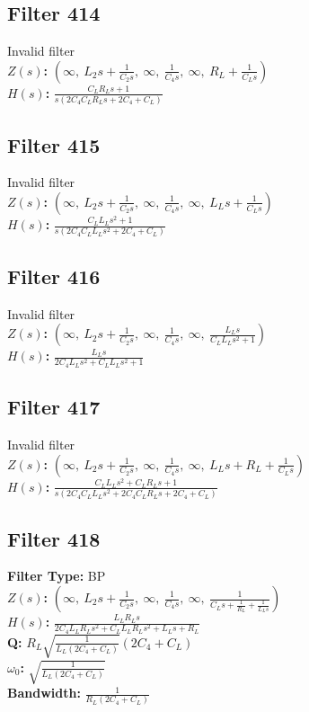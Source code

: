 \documentclass{article}
\begin{document}
\subsection*{Filter 414}
Invalid filter \\ 
\textbf{$Z(s)$:} $\left( \infty, \  L_{2} s + \frac{1}{C_{2} s}, \  \infty, \  \frac{1}{C_{4} s}, \  \infty, \  R_{L} + \frac{1}{C_{L} s}\right)$ \\ 
\textbf{$H(s)$:} $\frac{C_{L} R_{L} s + 1}{s \left(2 C_{4} C_{L} R_{L} s + 2 C_{4} + C_{L}\right)}$ \\ 
\subsection*{Filter 415}
Invalid filter \\ 
\textbf{$Z(s)$:} $\left( \infty, \  L_{2} s + \frac{1}{C_{2} s}, \  \infty, \  \frac{1}{C_{4} s}, \  \infty, \  L_{L} s + \frac{1}{C_{L} s}\right)$ \\ 
\textbf{$H(s)$:} $\frac{C_{L} L_{L} s^{2} + 1}{s \left(2 C_{4} C_{L} L_{L} s^{2} + 2 C_{4} + C_{L}\right)}$ \\ 
\subsection*{Filter 416}
Invalid filter \\ 
\textbf{$Z(s)$:} $\left( \infty, \  L_{2} s + \frac{1}{C_{2} s}, \  \infty, \  \frac{1}{C_{4} s}, \  \infty, \  \frac{L_{L} s}{C_{L} L_{L} s^{2} + 1}\right)$ \\ 
\textbf{$H(s)$:} $\frac{L_{L} s}{2 C_{4} L_{L} s^{2} + C_{L} L_{L} s^{2} + 1}$ \\ 
\subsection*{Filter 417}
Invalid filter \\ 
\textbf{$Z(s)$:} $\left( \infty, \  L_{2} s + \frac{1}{C_{2} s}, \  \infty, \  \frac{1}{C_{4} s}, \  \infty, \  L_{L} s + R_{L} + \frac{1}{C_{L} s}\right)$ \\ 
\textbf{$H(s)$:} $\frac{C_{L} L_{L} s^{2} + C_{L} R_{L} s + 1}{s \left(2 C_{4} C_{L} L_{L} s^{2} + 2 C_{4} C_{L} R_{L} s + 2 C_{4} + C_{L}\right)}$ \\ 
\subsection*{Filter 418}
\textbf{Filter Type:} BP \\ 
\textbf{$Z(s)$:} $\left( \infty, \  L_{2} s + \frac{1}{C_{2} s}, \  \infty, \  \frac{1}{C_{4} s}, \  \infty, \  \frac{1}{C_{L} s + \frac{1}{R_{L}} + \frac{1}{L_{L} s}}\right)$ \\ 
\textbf{$H(s)$:} $\frac{L_{L} R_{L} s}{2 C_{4} L_{L} R_{L} s^{2} + C_{L} L_{L} R_{L} s^{2} + L_{L} s + R_{L}}$ \\ 
\textbf{Q:} $R_{L} \sqrt{\frac{1}{L_{L} \left(2 C_{4} + C_{L}\right)}} \left(2 C_{4} + C_{L}\right)$ \\ 
\textbf{$\omega_0$:} $\sqrt{\frac{1}{L_{L} \left(2 C_{4} + C_{L}\right)}}$ \\ 
\textbf{Bandwidth:} $\frac{1}{R_{L} \left(2 C_{4} + C_{L}\right)}$ \\ 
\end{document}
